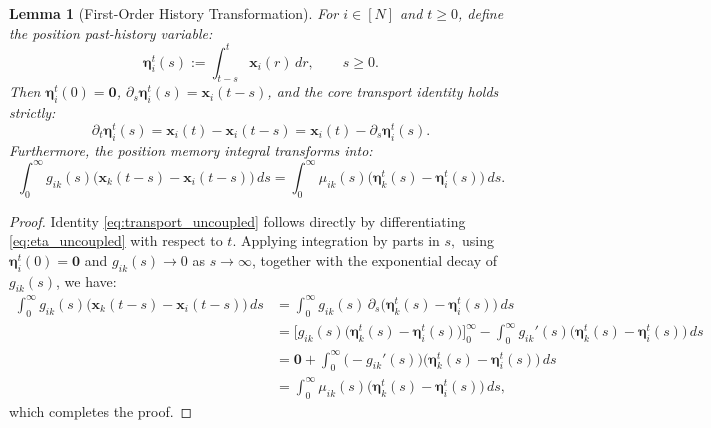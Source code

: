 \documentclass[10pt,a4paper]{amsart}
\newtheorem{lemma}{Lemma}
\begin{document}
\begin{lemma}[First-Order History Transformation]\label{lem:uncoupled_transform_1st}
For $i \in [N]$ and $t \ge 0$, define the position past-history variable:
\begin{equation} \label{eq:eta_uncoupled}
\boldsymbol{\eta}_i^t(s) := \int_{t-s}^{t} \boldsymbol{x}_i(r)\,dr, \qquad s \ge 0.
\end{equation}
Then $\boldsymbol{\eta}_i^t(0) = \mathbf{0}$, $\partial_s \boldsymbol{\eta}_i^t(s) = \boldsymbol{x}_i(t-s)$, and the core transport identity holds strictly:
\begin{equation}\label{eq:transport_uncoupled}
\partial_t \boldsymbol{\eta}_i^t(s) = \boldsymbol{x}_i(t) - \boldsymbol{x}_i(t-s) = \boldsymbol{x}_i(t) - \partial_s \boldsymbol{\eta}_i^t(s).
\end{equation}
Furthermore, the position memory integral transforms into:
\begin{equation*}\label{eq:ibp_uncoupled}
\int_{0}^{\infty} g_{ik}(s)\bigl(\boldsymbol{x}_k(t-s)-\boldsymbol{x}_i(t-s)\bigr)\,ds = \int_0^\infty \mu_{ik}(s) \bigl(\boldsymbol{\eta}_k^t(s) - \boldsymbol{\eta}_i^t(s)\bigr)\,ds.
\end{equation*}
\end{lemma}

\begin{proof}
Identity \eqref{eq:transport_uncoupled} follows directly by differentiating \eqref{eq:eta_uncoupled} with respect to $t$. Applying integration by parts in $s,$ using $\boldsymbol{\eta}_i^t(0)=\mathbf{0}$ and $g_{ik}(s) \rightarrow  0$ as $s\rightarrow \infty$, together with the exponential decay of $g_{ik}(s)$, we have:
{\small
\begin{align*}
\int_{0}^{\infty} g_{ik}(s)\bigl(\boldsymbol{x}_k(t-s)-\boldsymbol{x}_i(t-s)\bigr)\,ds &= \int_0^\infty g_{ik}(s)\, \partial_s \bigl(\boldsymbol{\eta}_k^t(s) - \boldsymbol{\eta}_i^t(s)\bigr)\, ds \\
&= \Big[g_{ik}(s)\big(\boldsymbol{\eta}_k^t(s)-\boldsymbol{\eta}_i^t(s)\big)\Big]_0^\infty - \int_0^\infty g_{ik}'(s)\big(\boldsymbol{\eta}_k^t(s) - \boldsymbol{\eta}_i^t(s)\big)\,ds \\
&= \mathbf{0} + \int_0^\infty \big(-g_{ik}'(s)\big)\big(\boldsymbol{\eta}_k^t(s) - \boldsymbol{\eta}_i^t(s)\big)\,ds \\
&= \int_0^\infty \mu_{ik}(s) \bigl(\boldsymbol{\eta}_k^t(s) - \boldsymbol{\eta}_i^t(s)\bigr)\, ds,
\end{align*}
}
which completes the proof.
\end{proof}
\end{document}
